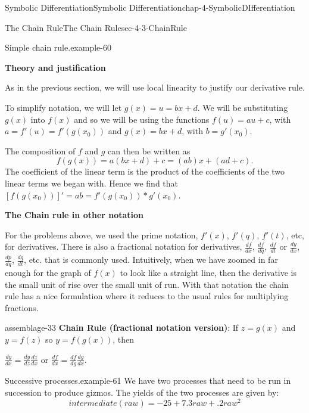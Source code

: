 \documentclass[oneside,10pt,]{book}
\newcommand{\terminology}[1]{\textbf{#1}}
\numberwithin{equation}{section}
\begin{document}
\begin{chapterptx}{Symbolic Differentiation}{}{Symbolic Differentiation}{}{}{chap-4-SymbolicDIfferentiation}
\begin{sectionptx}{The Chain Rule}{}{The Chain Rule}{}{}{sec-4-3-ChainRule}
\begin{example}{Simple chain rule.}{example-60}
\end{example}
\hypertarget{p-1634}{}%
\terminology{Theory and justification}%
\par
\hypertarget{p-1635}{}%
As in the previous section, we will use local linearity to justify our derivative rule.%
\par
\hypertarget{p-1636}{}%
To simplify notation, we will let \(g(x)=u=b x+d\). We will be substituting \(g(x)\) into \(f(x)\) and so we will be using the functions \(f(u)=a u+c \), with  \(a=f' (u)=f' (g(x_0 ))\) and \(g(x)=b x+d\), with \(b=g'(x_0 )\).%
\par
\hypertarget{p-1637}{}%
The composition of \(f\) and \(g\) can then be written as%
%
\begin{equation*}
f(g(x))=a (b x+d)+c=(a b) x+(a d+c).
\end{equation*}
\hypertarget{p-1638}{}%
The coefficient of the linear term is the product of the coefficients of the two linear terms we began with.  Hence we find that \([f(g(x_0 ))]'=a b=f'(g(x_0 ))*g'(x_0)\).%
\par
\hypertarget{p-1639}{}%
\terminology{The Chain rule in other notation}%
\par
\hypertarget{p-1640}{}%
For the problems above, we used the prime notation, \(f'(x)\), \(f'(q)\), \(f'(t)\), etc, for derivatives.  There is also a fractional notation for derivatives, \(\frac{df}{dx}\), \(\frac{df}{dq}\), \(\frac{df}{dt}\) or \(\frac{dy}{dx}\), \(\frac{dp}{dq}\), \(\frac{dq}{dt}\), etc. that is commonly used.  Intuitively, when we have zoomed in far enough for the graph of \(f(x)\) to look like a straight line, then the derivative is the small unit of rise over the small unit of run.  With that notation the chain rule has a nice formulation where it reduces to the usual rules for multiplying fractions.%
\begin{assemblage}{}{assemblage-33}%
\hypertarget{p-1641}{}%
\terminology{Chain Rule (fractional notation version)}: If \(z=g(x)\) and \(y=f(z)\) so \(y=f(g(x))\), then%
\par
\hypertarget{p-1642}{}%
\(\frac{dy}{dx}=\frac{dy}{dz} \frac{dz}{dx}\)  or \(\frac{df}{dx}=\frac{df}{dg}  \frac{dg}{dx} \).%
\end{assemblage}
\begin{example}{Successive processes.}{example-61}%
\hypertarget{p-1643}{}%
We have two processes that need to be run in succession to produce gizmos.  The yields of the two processes are given by:%
%
\begin{equation*}
intermediate(raw)=-25+7.3 raw+.2 raw^2

\end{equation*}
\end{example}
\end{sectionptx}
\end{chapterptx}
\end{document}
